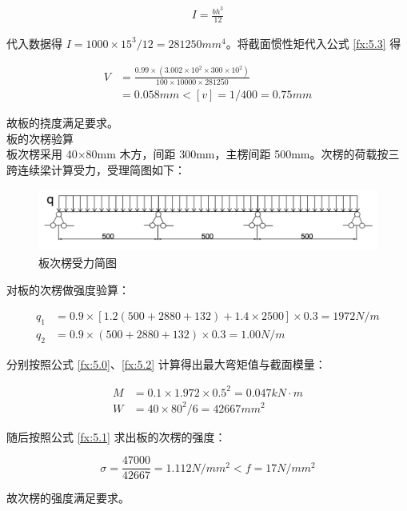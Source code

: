 \begin{align}
    \label{fx:5.4}
    I=\frac{bh^3}{12}
\end{align}

代入数据得 $I=1000\times 15^3/12=281250 mm^4$。将截面惯性矩代入公式 \ref{fx:5.3} 得

\begin{align*}
    V&=\frac{0.99\times (3.002\times 10^2\times 300\times 10^2)}{100\times 10000\times 281250}\\
    &=0.058 mm < [v]=1/400=0.75 mm
\end{align*}

故板的挠度满足要求。\\

 板的次楞验算\\

板次楞采用 40×80mm 木方，间距 300mm，主楞间距 500mm。次楞的荷载按三跨连续梁计算受力，受理简图如下：

\begin{figure}[thbp!]
    \centering
    \includegraphics[width=1.0\linewidth]{figure/c5f2.png}
    \caption{板次楞受力简图}
    \label{fig:c5f2a}
\end{figure}


对板的次楞做强度验算：

\begin{align*}
    q_1&=0.9\times [1.2(500+2880+132)+1.4\times 2500]\times 0.3=1972 N/m \\
    q_2&=0.9\times (500+2880+132)\times 0.3=1.00 N/m
\end{align*}

分别按照公式 \ref{fx:5.0}、\ref{fx:5.2} 计算得出最大弯矩值与截面模量：

\begin{align*}
    M&=0.1\times 1.972\times 0.5^2=0.047 kN \cdot m\\
    W&=40\times 80^2 /6=42667 mm^2
\end{align*}

随后按照公式 \ref{fx:5.1} 求出板的次楞的强度：

\[
    \sigma = \frac{47000}{42667}=1.112 N/mm^2< f=17N/mm^2
\]

故次楞的强度满足要求。\\

